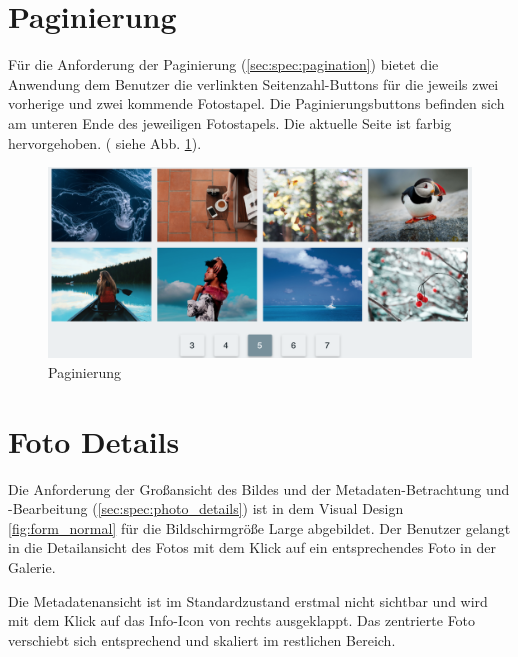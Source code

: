 \section{Paginierung}

Für die Anforderung der Paginierung (\ref{sec:spec:pagination}) bietet die Anwendung dem Benutzer die verlinkten Seitenzahl-Buttons für die jeweils zwei vorherige und zwei kommende Fotostapel. Die Paginierungsbuttons befinden sich am unteren Ende des jeweiligen Fotostapels. Die aktuelle Seite ist farbig hervorgehoben.
( siehe Abb. \ref{fig:pagination}).

\begin{figure}[htp]     %
\centering
\includegraphics[width=1.0\textwidth]{images/pagination}
\caption{Paginierung}\label{fig:pagination}
\end{figure}

\section{Foto Details}
Die Anforderung der Großansicht des Bildes und der Metadaten-Betrachtung und -Bearbeitung (\ref{sec:spec:photo_details}) ist in dem Visual Design \ref{fig:form_normal} für die Bildschirmgröße Large abgebildet. Der Benutzer gelangt in die Detailansicht des Fotos mit dem Klick auf ein entsprechendes Foto in der Galerie.

Die Metadatenansicht ist im Standardzustand erstmal nicht sichtbar und wird mit dem Klick auf das Info-Icon von rechts ausgeklappt. Das zentrierte Foto verschiebt sich entsprechend und skaliert im restlichen Bereich.

